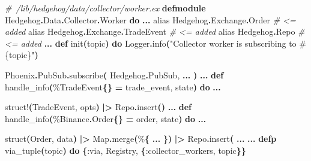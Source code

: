 \documentclass[
  oneside]{book}
\newenvironment{Shaded}{\begin{snugshade}}{\end{snugshade}}
\newcommand{\CommentTok}[1]{\textcolor[rgb]{0.56,0.35,0.01}{\textit{#1}}}
\newcommand{\ConstantTok}[1]{\textcolor[rgb]{0.56,0.35,0.01}{#1}}
\newcommand{\FunctionTok}[1]{\textcolor[rgb]{0.13,0.29,0.53}{\textbf{#1}}}
\newcommand{\ImportTok}[1]{#1}
\newcommand{\KeywordTok}[1]{\textcolor[rgb]{0.13,0.29,0.53}{\textbf{#1}}}
\newcommand{\NormalTok}[1]{#1}
\newcommand{\OperatorTok}[1]{\textcolor[rgb]{0.81,0.36,0.00}{\textbf{#1}}}
\newcommand{\OtherTok}[1]{\textcolor[rgb]{0.56,0.35,0.01}{#1}}
\newcommand{\StringTok}[1]{\textcolor[rgb]{0.31,0.60,0.02}{#1}}
\newcommand{\VariableTok}[1]{\textcolor[rgb]{0.00,0.00,0.00}{#1}}
\begin{document}
\begin{Shaded}
\begin{Highlighting}[]
\CommentTok{\# /lib/hedgehog/data/collector/worker.ex}
\KeywordTok{defmodule} \ConstantTok{Hedgehog}\OperatorTok{.}\ConstantTok{Data}\OperatorTok{.}\ConstantTok{Collector}\OperatorTok{.}\ConstantTok{Worker} \KeywordTok{do}
  \OperatorTok{...}
  \ImportTok{alias} \ConstantTok{Hedgehog}\OperatorTok{.}\ConstantTok{Exchange}\OperatorTok{.}\ConstantTok{Order}      \CommentTok{\# \textless{}= added}
  \ImportTok{alias} \ConstantTok{Hedgehog}\OperatorTok{.}\ConstantTok{Exchange}\OperatorTok{.}\ConstantTok{TradeEvent} \CommentTok{\# \textless{}= added}
  \ImportTok{alias} \ConstantTok{Hedgehog}\OperatorTok{.}\ConstantTok{Repo}                \CommentTok{\# \textless{}= added}
  \OperatorTok{...}
  \KeywordTok{def}\NormalTok{ init}\FunctionTok{(}\NormalTok{topic}\FunctionTok{)} \KeywordTok{do}
    \ConstantTok{Logger}\OperatorTok{.}\NormalTok{info}\FunctionTok{(}\StringTok{"Collector worker is subscribing to }\OtherTok{\#\{}\NormalTok{topic}\OtherTok{\}}\StringTok{"}\FunctionTok{)}

    \ConstantTok{Phoenix}\OperatorTok{.}\ConstantTok{PubSub}\OperatorTok{.}\NormalTok{subscribe}\FunctionTok{(}
      \ConstantTok{Hedgehog}\OperatorTok{.}\ConstantTok{PubSub}\NormalTok{,}
      \OperatorTok{...}
     \FunctionTok{)}
  \OperatorTok{...}
  \KeywordTok{def}\NormalTok{ handle\_info}\FunctionTok{(}\NormalTok{\%}\ConstantTok{TradeEvent}\FunctionTok{\{\}} \OperatorTok{=}\NormalTok{ trade\_event, state}\FunctionTok{)} \KeywordTok{do}
    \OperatorTok{...}

\NormalTok{    struct!}\FunctionTok{(}\ConstantTok{TradeEvent}\NormalTok{, opts}\FunctionTok{)}
    \OperatorTok{|\textgreater{}} \ConstantTok{Repo}\OperatorTok{.}\NormalTok{insert}\FunctionTok{()}
  \OperatorTok{...}
  \KeywordTok{def}\NormalTok{ handle\_info}\FunctionTok{(}\NormalTok{\%}\ConstantTok{Binance}\OperatorTok{.}\ConstantTok{Order}\FunctionTok{\{\}} \OperatorTok{=}\NormalTok{ order, state}\FunctionTok{)} \KeywordTok{do}
    \OperatorTok{...}

\NormalTok{    struct}\FunctionTok{(}\ConstantTok{Order}\NormalTok{, data}\FunctionTok{)}
    \OperatorTok{|\textgreater{}} \ConstantTok{Map}\OperatorTok{.}\NormalTok{merge}\FunctionTok{(}\NormalTok{\%}\FunctionTok{\{}
      \OperatorTok{...}
    \FunctionTok{\})}
    \OperatorTok{|\textgreater{}} \ConstantTok{Repo}\OperatorTok{.}\NormalTok{insert}\FunctionTok{(}
    \OperatorTok{...}
  \OperatorTok{...}
  \KeywordTok{defp}\NormalTok{ via\_tuple}\FunctionTok{(}\NormalTok{topic}\FunctionTok{)} \KeywordTok{do}
    \FunctionTok{\{}\VariableTok{:via}\NormalTok{, }\ConstantTok{Registry}\NormalTok{, }\FunctionTok{\{}\VariableTok{:collector\_workers}\NormalTok{, topic}\FunctionTok{\}\}}
\end{Highlighting}
\end{Shaded}
\end{document}
